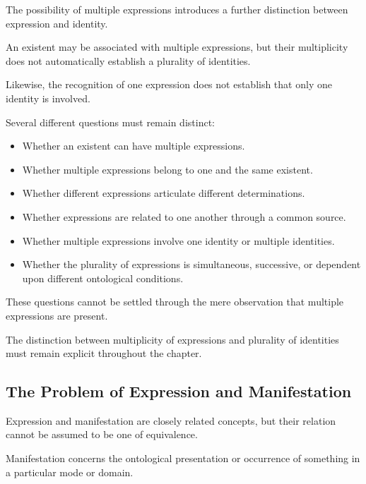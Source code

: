 The possibility of multiple expressions
introduces a further distinction between
expression and identity.

An existent may be associated with
multiple expressions, but their multiplicity
does not automatically establish
a plurality of identities.

Likewise, the recognition of one expression
does not establish that only one identity
is involved.

Several different questions must remain
distinct:

\begin{itemize}

    \item Whether an existent can have
    multiple expressions.

    \item Whether multiple expressions
    belong to one and the same existent.

    \item Whether different expressions
    articulate different determinations.

    \item Whether expressions are related
    to one another through a common source.

    \item Whether multiple expressions
    involve one identity or multiple
    identities.

    \item Whether the plurality of expressions
    is simultaneous, successive, or
    dependent upon different ontological
    conditions.

\end{itemize}

These questions cannot be settled
through the mere observation that
multiple expressions are present.

The distinction between multiplicity
of expressions and plurality of identities
must remain explicit throughout
the chapter.

\subsection{The Problem of Expression and Manifestation}

Expression and manifestation are closely
related concepts, but their relation
cannot be assumed to be one of equivalence.

Manifestation concerns the ontological
presentation or occurrence of something
in a particular mode or domain.

